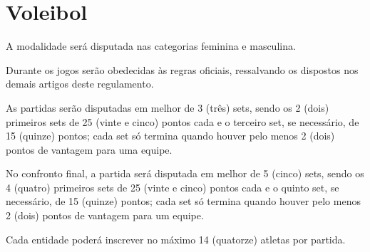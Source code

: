 {\let\clearpage\relax \chapter{Voleibol}}

\begin{article}
	A modalidade será disputada nas categorias feminina e masculina.
\end{article}

\begin{article}
	Durante os jogos serão obedecidas às regras oficiais, ressalvando os dispostos nos demais artigos deste regulamento.
\end{article}

\begin{article}
	As partidas serão disputadas em melhor de 3 (três) sets, sendo os 2 (dois) primeiros sets de 25 (vinte e cinco) pontos cada e o terceiro set, se necessário, de 15 (quinze) pontos; cada set só termina quando houver pelo menos 2 (dois) pontos de vantagem para uma equipe.

	\begin{xparagraph}
		No confronto final, a partida será disputada em melhor de 5 (cinco) sets, sendo os 4 (quatro) primeiros sets de 25 (vinte e cinco) pontos cada e o quinto set, se necessário, de 15 (quinze) pontos; cada set só termina quando houver pelo menos 2 (dois) pontos de vantagem para um equipe.
	\end{xparagraph}
\end{article}

\begin{article}
	Cada entidade poderá inscrever no máximo 14 (quatorze) atletas por partida.
\end{article}
